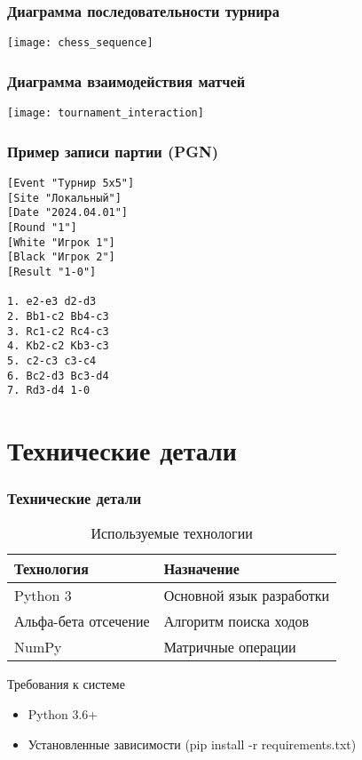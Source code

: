 \documentclass[14pt]{beamer}
\begin{document}
\begin{frame}
\frametitle{Диаграмма последовательности турнира}
\begin{center}
\texttt{[image: chess\_sequence]}
\end{center}
\end{frame}

\begin{frame}
\frametitle{Диаграмма взаимодействия матчей}
\begin{center}
\texttt{[image: tournament\_interaction]}
\end{center}
\end{frame}

\begin{frame}[fragile]
\frametitle{Пример записи партии (PGN)}
\begin{lstlisting}
[Event "Турнир 5x5"]
[Site "Локальный"]
[Date "2024.04.01"]
[Round "1"]
[White "Игрок 1"]
[Black "Игрок 2"]
[Result "1-0"]

1. e2-e3 d2-d3
2. Bb1-c2 Bb4-c3
3. Rc1-c2 Rc4-c3
4. Kb2-c2 Kb3-c3
5. c2-c3 c3-c4
6. Bc2-d3 Bc3-d4
7. Rd3-d4 1-0
\end{lstlisting}
\end{frame}

\section{Технические детали}

\begin{frame}
\frametitle{Технические детали}
\begin{table}
\centering
\begin{tabular}{ll}
\textbf{Технология} & \textbf{Назначение} \\
\hline
Python 3 & Основной язык разработки \\
Альфа-бета отсечение & Алгоритм поиска ходов \\
NumPy & Матричные операции \\
\end{tabular}
\caption{Используемые технологии}
\end{table}

\begin{alertblock}{Требования к системе}
\begin{itemize}
\item Python 3.6+
\item Установленные зависимости (pip install -r requirements.txt)
\end{itemize}
\end{alertblock}
\end{frame}
\end{document}
